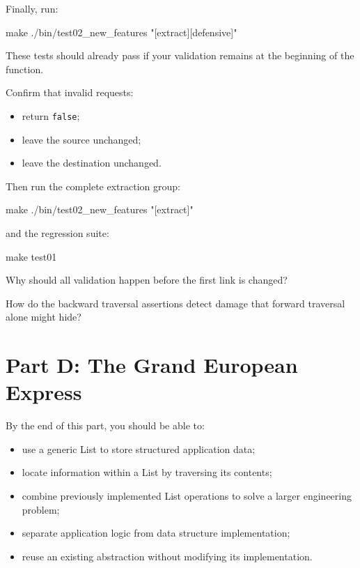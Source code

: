 \documentclass{csc2059practical}
\begin{document}
Finally, run:

\begin{terminal}
make
./bin/test02_new_features "[extract][defensive]"
\end{terminal}

These tests should already pass if your validation remains at the beginning of the function.

Confirm that invalid requests:

\begin{itemize}
    \item return \texttt{false};
    \item leave the source unchanged;
    \item leave the destination unchanged.
\end{itemize}

Then run the complete extraction group:

\begin{terminal}
make
./bin/test02_new_features "[extract]"
\end{terminal}

and the regression suite:

\begin{terminal}
make test01
\end{terminal}

\begin{reflectionbox}
Why should all validation happen before the first link is changed?

How do the backward traversal assertions detect damage that forward traversal alone might hide?
\end{reflectionbox}

\section{Part D: The Grand European Express}

\begin{learningoutcomes}
By the end of this part, you should be able to:

\begin{itemize}
    \item use a generic List to store structured application data;
    \item locate information within a List by traversing its contents;
    \item combine previously implemented List operations to solve a larger engineering problem;
    \item separate application logic from data structure implementation;
    \item reuse an existing abstraction without modifying its implementation.
\end{itemize}
\end{learningoutcomes}
\end{document}
